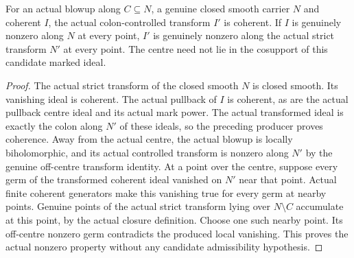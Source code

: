 \begin{lemma}
\label{hir:coherent-transform-step-without-admissibility}
\leanok
For an actual blowup along $C\subseteq N$, a genuine closed smooth carrier
$N$ and coherent $I$, the actual colon-controlled transform $I'$ is coherent.
If $I$ is genuinely nonzero along $N$ at every point, $I'$ is genuinely
nonzero along the actual strict transform $N'$ at every point. The centre
need not lie in the cosupport of this candidate marked ideal.
\end{lemma}
\begin{proof}
The actual strict transform of the closed smooth $N$ is closed smooth.
Its vanishing ideal is coherent. The actual pullback of $I$ is coherent,
as are the actual pullback centre ideal and its actual mark power.
The actual transformed ideal is exactly the colon along $N'$ of these
ideals, so the preceding producer proves coherence.
Away from the actual centre, the actual blowup is locally biholomorphic,
and its actual controlled transform is nonzero along $N'$ by the genuine
off-centre transform identity. At a point over the centre, suppose every
germ of the transformed coherent ideal vanished on $N'$ near that point.
Actual finite coherent generators make this vanishing true for every germ
at nearby points. Genuine points of the actual strict transform lying over
$N\setminus C$ accumulate at this point, by the actual closure definition.
Choose one such nearby point. Its off-centre nonzero germ contradicts the
produced local vanishing. This proves the actual nonzero property without
any candidate admissibility hypothesis.
\end{proof}

